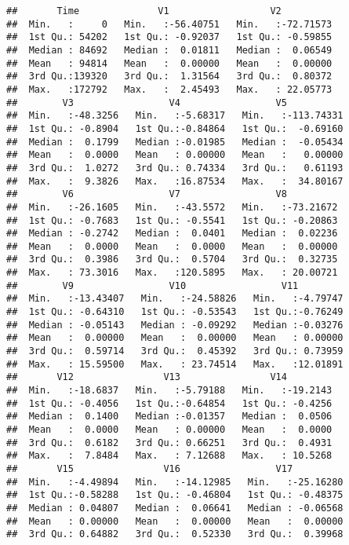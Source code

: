 \documentclass[]{article}
\begin{document}
\begin{verbatim}
##       Time              V1                  V2           
##  Min.   :     0   Min.   :-56.40751   Min.   :-72.71573  
##  1st Qu.: 54202   1st Qu.: -0.92037   1st Qu.: -0.59855  
##  Median : 84692   Median :  0.01811   Median :  0.06549  
##  Mean   : 94814   Mean   :  0.00000   Mean   :  0.00000  
##  3rd Qu.:139320   3rd Qu.:  1.31564   3rd Qu.:  0.80372  
##  Max.   :172792   Max.   :  2.45493   Max.   : 22.05773  
##        V3                 V4                 V5            
##  Min.   :-48.3256   Min.   :-5.68317   Min.   :-113.74331  
##  1st Qu.: -0.8904   1st Qu.:-0.84864   1st Qu.:  -0.69160  
##  Median :  0.1799   Median :-0.01985   Median :  -0.05434  
##  Mean   :  0.0000   Mean   : 0.00000   Mean   :   0.00000  
##  3rd Qu.:  1.0272   3rd Qu.: 0.74334   3rd Qu.:   0.61193  
##  Max.   :  9.3826   Max.   :16.87534   Max.   :  34.80167  
##        V6                 V7                 V8           
##  Min.   :-26.1605   Min.   :-43.5572   Min.   :-73.21672  
##  1st Qu.: -0.7683   1st Qu.: -0.5541   1st Qu.: -0.20863  
##  Median : -0.2742   Median :  0.0401   Median :  0.02236  
##  Mean   :  0.0000   Mean   :  0.0000   Mean   :  0.00000  
##  3rd Qu.:  0.3986   3rd Qu.:  0.5704   3rd Qu.:  0.32735  
##  Max.   : 73.3016   Max.   :120.5895   Max.   : 20.00721  
##        V9                 V10                 V11          
##  Min.   :-13.43407   Min.   :-24.58826   Min.   :-4.79747  
##  1st Qu.: -0.64310   1st Qu.: -0.53543   1st Qu.:-0.76249  
##  Median : -0.05143   Median : -0.09292   Median :-0.03276  
##  Mean   :  0.00000   Mean   :  0.00000   Mean   : 0.00000  
##  3rd Qu.:  0.59714   3rd Qu.:  0.45392   3rd Qu.: 0.73959  
##  Max.   : 15.59500   Max.   : 23.74514   Max.   :12.01891  
##       V12                V13                V14          
##  Min.   :-18.6837   Min.   :-5.79188   Min.   :-19.2143  
##  1st Qu.: -0.4056   1st Qu.:-0.64854   1st Qu.: -0.4256  
##  Median :  0.1400   Median :-0.01357   Median :  0.0506  
##  Mean   :  0.0000   Mean   : 0.00000   Mean   :  0.0000  
##  3rd Qu.:  0.6182   3rd Qu.: 0.66251   3rd Qu.:  0.4931  
##  Max.   :  7.8484   Max.   : 7.12688   Max.   : 10.5268  
##       V15                V16                 V17           
##  Min.   :-4.49894   Min.   :-14.12985   Min.   :-25.16280  
##  1st Qu.:-0.58288   1st Qu.: -0.46804   1st Qu.: -0.48375  
##  Median : 0.04807   Median :  0.06641   Median : -0.06568  
##  Mean   : 0.00000   Mean   :  0.00000   Mean   :  0.00000  
##  3rd Qu.: 0.64882   3rd Qu.:  0.52330   3rd Qu.:  0.39968  

\end{verbatim}
\end{document}
